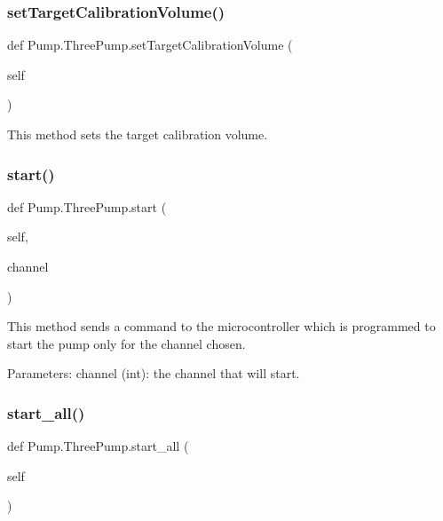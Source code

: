 \subsubsection{\texorpdfstring{setTargetCalibrationVolume()}{setTargetCalibrationVolume()}}
{\footnotesize\ttfamily def Pump.\+Three\+Pump.\+set\+Target\+Calibration\+Volume (\begin{DoxyParamCaption}\item[{}]{self }\end{DoxyParamCaption})}

\begin{DoxyVerb}This method sets the target calibration volume.
\end{DoxyVerb}
 \mbox{\label{class_pump_1_1_three_pump_aae38b27e57b8ab4b0c93f79cf804fe43}} 
\subsubsection{\texorpdfstring{start()}{start()}}
{\footnotesize\ttfamily def Pump.\+Three\+Pump.\+start (\begin{DoxyParamCaption}\item[{}]{self,  }\item[{}]{channel }\end{DoxyParamCaption})}

\begin{DoxyVerb}This method sends a command to the microcontroller which is programmed to start the pump only for the channel chosen.

Parameters:
    channel (int): the channel that will start.
\end{DoxyVerb}
 \mbox{\label{class_pump_1_1_three_pump_ac262d9a7146567c88d307d25f4aadca8}} 
\subsubsection{\texorpdfstring{start\_all()}{start\_all()}}
{\footnotesize\ttfamily def Pump.\+Three\+Pump.\+start\+\_\+all (\begin{DoxyParamCaption}\item[{}]{self }\end{DoxyParamCaption})}

